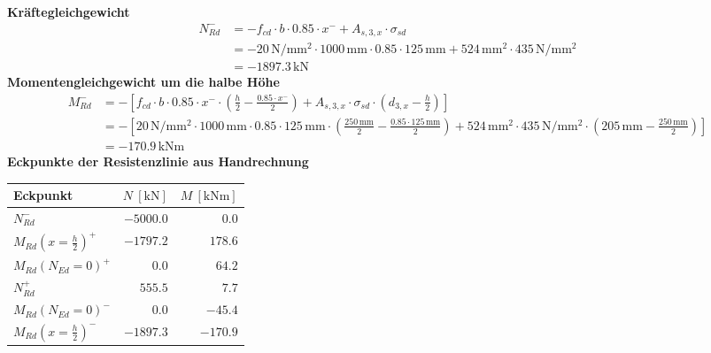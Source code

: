 \documentclass[11pt,a4paper]{article}
\begin{document}
\noindent\textbf{Kräftegleichgewicht}
\begin{equation*}
\begin{aligned}
  N_{Rd}^{-} &= -f_{cd} \cdot b \cdot 0.85 \cdot x^{-} + A_{s,3,x} \cdot \sigma_{sd} \\
  &= -20\,\mathrm{N}/\mathrm{mm}^{2} \cdot 1000\,\mathrm{mm} \cdot 0.85 \cdot 125\,\mathrm{mm} + 524\,\mathrm{mm}^{2} \cdot 435\,\mathrm{N}/\mathrm{mm}^{2} \\
  &= -1897.3\,\mathrm{kN}
\end{aligned}
\end{equation*}
\noindent\textbf{Momentengleichgewicht um die halbe Höhe}
\begin{equation*}
\begin{aligned}
  M_{Rd}^{-} &= -\left[f_{cd} \cdot b \cdot 0.85 \cdot x^{-} \cdot \left(\tfrac{h}{2} - \tfrac{0.85 \cdot x^{-}}{2}\right) + A_{s,3,x} \cdot \sigma_{sd} \cdot \left(d_{3,x} - \tfrac{h}{2}\right)\right] \\
  &= -\left[20\,\mathrm{N}/\mathrm{mm}^{2} \cdot 1000\,\mathrm{mm} \cdot 0.85 \cdot 125\,\mathrm{mm} \cdot \left(\tfrac{250\,\mathrm{mm}}{2} - \tfrac{0.85 \cdot 125\,\mathrm{mm}}{2}\right) + 524\,\mathrm{mm}^{2} \cdot 435\,\mathrm{N}/\mathrm{mm}^{2} \cdot \left(205\,\mathrm{mm} - \tfrac{250\,\mathrm{mm}}{2}\right)\right] \\
  &= -170.9\,\mathrm{kNm}
\end{aligned}
\end{equation*}
\noindent\textbf{Eckpunkte der Resistenzlinie aus Handrechnung}
\begin{longtable}{lrr}
\hline
Eckpunkt & $N\ [\mathrm{kN}]$ & $M\ [\mathrm{kNm}]$ \\
\hline
\endhead
$N_{Rd}^{-}$ & $-5000.0$ & $0.0$ \\
$M_{Rd}(x=\tfrac{h}{2})^{+}$ & $-1797.2$ & $178.6$ \\
$M_{Rd}(N_{Ed}=0)^{+}$ & $0.0$ & $64.2$ \\
$N_{Rd}^{+}$ & $555.5$ & $7.7$ \\
$M_{Rd}(N_{Ed}=0)^{-}$ & $0.0$ & $-45.4$ \\
$M_{Rd}(x=\tfrac{h}{2})^{-}$ & $-1897.3$ & $-170.9$ \\
\hline
\end{longtable}
\end{document}
